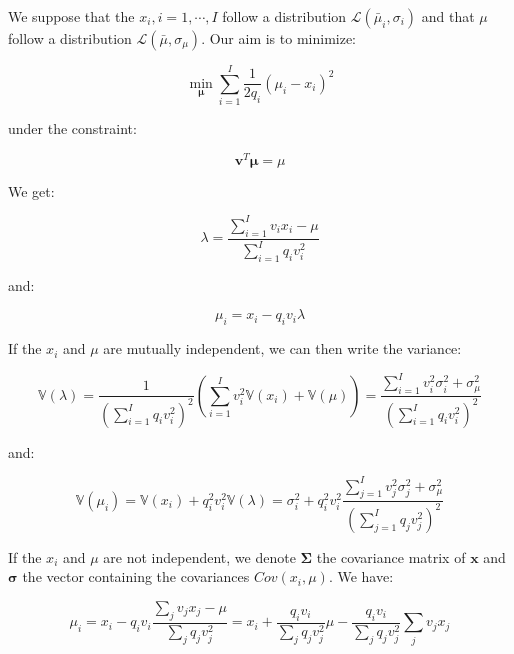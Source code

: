 \documentclass{tex/note}
\begin{document}
We suppose that the $x_i, i = 1 , \cdots , I$ follow a distribution $\mathcal{L} \left( \bar{\mu}_i , \sigma_i \right)$ and that $\mu$ follow a distribution $\mathcal{L} \left( \bar{\mu} , \sigma_{\mu} \right)$. Our aim is to minimize:

\begin{equation*}
\min_{\bm{\mu}} \sum_{i = 1}^I \frac{1}{2 q_i} \left( \mu_i - x_i \right) ^2
\end{equation*}

under the constraint:

\begin{equation*}
\bm{v}^T \bm{\mu} = \mu
\end{equation*}

We get:

\begin{equation*}
\lambda = \frac{\sum_{i = 1}^I v_i x_i - \mu}{\sum_{i = 1}^I q_i v_i^2}
\end{equation*}

and:

\begin{equation*}
\mu_i = x_i - q_i v_i \lambda
\end{equation*}

If the $x_i$ and $\mu$ are mutually independent, we can then write the variance:

\begin{equation*}
\mathbb{V} \left( \lambda \right) = \frac{1}{\left( \sum_{i = 1}^I q_i v_i^2 \right) ^2} \left( \sum_{i = 1}^I v_i^2 \mathbb{V} \left( x_i \right) + \mathbb{V} \left( \mu \right) \right) = \frac{\sum_{i = 1}^I v_i^2 \sigma_i^2 + \sigma_{\mu}^2}{\left( \sum_{i = 1}^I q_i v_i^2 \right) ^2}
\end{equation*}

and:

\begin{equation*}
\mathbb{V} \left( \mu_i \right) = \mathbb{V} \left( x_i \right) + q_i^2 v_i^2 \mathbb{V} \left( \lambda \right) = \sigma_i^2 + q_i^2 v_i^2 \frac{\sum_{j = 1}^I v_j^2 \sigma_j^2 + \sigma_{\mu}^2}{\left( \sum_{j = 1}^I q_j v_j^2 \right) ^2}
\end{equation*}

If the $x_i$ and $\mu$ are not independent, we denote $\bm{\Sigma}$ the covariance matrix of $\bm{x}$ and $\bm{\sigma}$ the vector containing the covariances $Cov \left( x_i , \mu \right)$. We have:

\begin{equation*}
\mu_i = x_i - q_i v_i \frac{\sum_j v_j x_j - \mu}{\sum_j q_j v_j^2} = x_i + \frac{q_i v_i}{\sum_j q_j v_j^2} \mu - \frac{q_i v_i}{\sum_j q_j v_j^2} \sum_j v_j x_j
\end{equation*}
\end{document}
